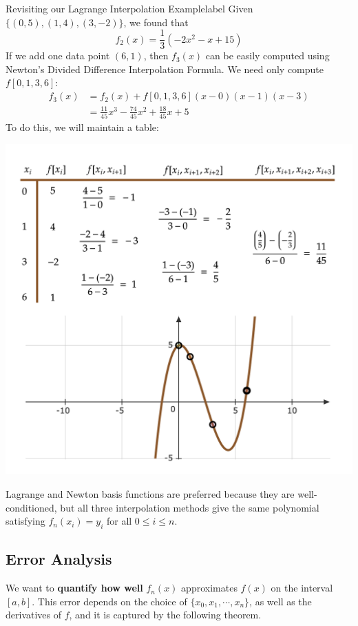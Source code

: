 \begin{ex}{Revisiting our Lagrange Interpolation Example}{label}
     Given $\{(0,5),(1,4),(3,-2)\}$, we found that
     \[f_2(x)=\frac{1}{3}\left(-2 x^2-x+15\right)\]
     If we add one data point $(6, 1)$, then $f_3(x)$ can be easily computed using Newton's Divided Difference Interpolation Formula. We need only compute $f[0, 1, 3, 6]$:
     \begin{align*}
     f_3(x)
     &=f_2(x)+f[0,1,3,6](x-0)(x-1)(x-3) \\
     &=\frac{11}{45} x^3-\frac{74}{45} x^2+\frac{18}{45} x+5
     \end{align*}
     To do this, we will maintain a table:
    \begin{center}
    \includegraphics[width=\textwidth]{figures/fig-12.png}
    \end{center}
\end{ex}

\begin{marginfigure}
    Lagrange and Newton basis functions are preferred because they are well-conditioned, but all three interpolation methods give the same polynomial satisfying $f_n(x_i) = y_i$ for all $0 \leq i \leq n$.
\end{marginfigure}

\subsection{Error Analysis}
We want to \textbf{quantify how well} $f_n(x)$ approximates $f(x)$ on the interval $[a, b]$. This error depends on the choice of $\{x_0, x_1, \cdots, x_n\}$, as well as the derivatives of $f$, and it is captured by the following theorem.

